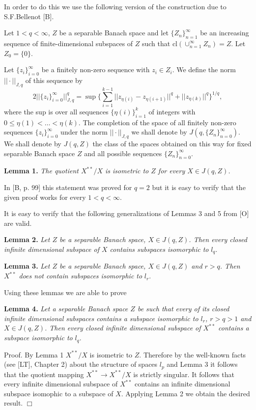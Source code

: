 In order to do this we use the following version of the construction due to
S.F.Bellenot [B].

Let $1<q<\infty$, $Z$ be a separable Banach space and let
$\{Z_n\}_{n=1}^\infty$ be an increasing sequence of finite-dimensional
subspaces of $Z$ such that cl$(\cup_{n=1}^\infty Z_n)=Z$. Let
$Z_0=\{0\}$.

Let $\{z_i\}_{i=0}^\infty$ be a finitely non-zero sequence with
$z_i\in Z_i$. We define the norm $||\cdot||_{J,q}$ of this sequence
by
$$2||\{z_i\}_{i=0}^\infty||_{J,q}^q=\sup
\{\sum_{i=1}^{k-1}||z_{\eta(i)}-z_{\eta(i+1)}||^q+
||z_{\eta(k)}||^q\}^{1/q},$$
where the sup is over all sequences $\{\eta(i)\}_{i=1}^k$ of integers
with $0\le\eta(1)<\dots<\eta(k).$ The completion of the space of
all finitely non-zero sequences $\{z_i\}_{i=0}^\infty$ under the
norm $||\cdot||_{J,q}$ we shall denote by $J(q,\{Z_n\}_{n=0}^\infty)$.
We shall denote by $J(q,Z)$ the class of the spaces obtained on this
way for fixed separable Banach space $Z$ and all possible sequences
$\{Z_n\}_{n=0}^\infty$.

{\bf Lemma 1.} {\it The quotient $X^{**}/X$ is isometric to $Z$
for every $X\in J(q,Z)$.}

In [B, p. 99] this statement was proved for $q=2$ but it is easy
to verify that the given proof works for every
$1<q<\infty$.

It is easy to verify that the following generalizations of
Lemmas 3 and 5 from [O] are valid.

{\bf Lemma 2.} {\it Let $Z$ be a separable Banach space,
$X\in J(q,Z)$. Then every closed infinite dimensional
subspace of $X$ contains subspaces isomorphic to} $l_q$.

{\bf Lemma 3.} {\it Let $Z$ be a separable Banach space,
$X\in J(q,Z)$ and $r>q$. Then $X^{**}$ does not contain
subspaces isomorphic to} $l_r$.

Using these lemmas we are able to prove

{\bf Lemma 4.} {\it Let a separable Banach space $Z$ be such
that every of its closed infinite dimensional subspaces contains
a subspace isomorphic to $l_r$, $r>q>1$
and $X\in J(q,Z)$. Then every closed infinite dimensional subspace
of $X^{**}$ contains a subspace isomorphic to} $l_q$.

Proof. By Lemma 1 $X^{**}/X$ is isometric to $Z$. Therefore
by the well-known facts (see [LT], Chapter 2) about the
structure of spaces $l_p$ and Lemma 3 it follows that the
quotient mapping $X^{**}\to X^{**}/X$ is strictly singular.
It follows that every infinite dimensional subspace of
$X^{**}$ contains an infinite dimensional subspace isomophic
to a subspace of $X$. Applying  Lemma 2 we obtain the desired
result. $\Box$

